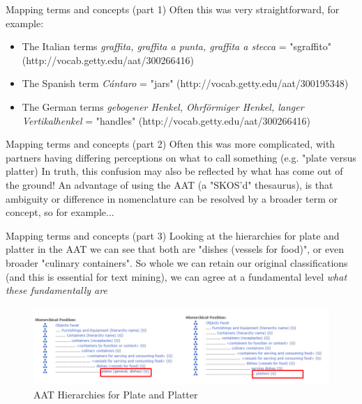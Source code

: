 \documentclass[xcolor=x11names, aspectratio=169,usenames,dvipsnames]{beamer}
\begin{document}
\begin{frame}{Mapping terms and concepts (part 1)}
Often this was very straightforward, for example:
\begin{itemize}
\item The Italian terms \emph{graffita, graffita a punta, graffita a stecca} = "sgraffito" (http://vocab.getty.edu/aat/300266416)
\item The Spanish term \emph{Cántaro} = "jars" (http://vocab.getty.edu/aat/300195348)
\item The German terms \emph{gebogener Henkel, Ohrförmiger Henkel, langer Vertikalhenkel} = "handles" (http://vocab.getty.edu/aat/300266416)
\end{itemize}
\end{frame}

\begin{frame}{Mapping terms and concepts (part 2)}
Often this was more complicated, with  partners having differing perceptions on what to call something (e.g. "plate versus platter)\newline
\newline
In truth, this confusion may also be reflected by what has come out of the ground!\newline
\newline
An advantage of using the AAT (a "SKOS'd" thesaurus), is that ambiguity or difference in nomenclature can be resolved by  a broader term or concept, so for example...
\end{frame}

\begin{frame}{Mapping terms and concepts (part 3)}
Looking at the hierarchies for plate and platter in the AAT we can see that both are "dishes (vessels for food)", or even broader "culinary containers". So whole we can retain our original classifications (and this is essential for text mining), we can agree at a fundamental level \emph{what these fundamentally are}
\begin{center}
\begin{figure}
\includegraphics[width=\textwidth]{img/tim_hierarchy_plate.png}
\caption{AAT Hierarchies for Plate and Platter}
\end{figure}
\end{center}
\end{frame}
\end{document}
